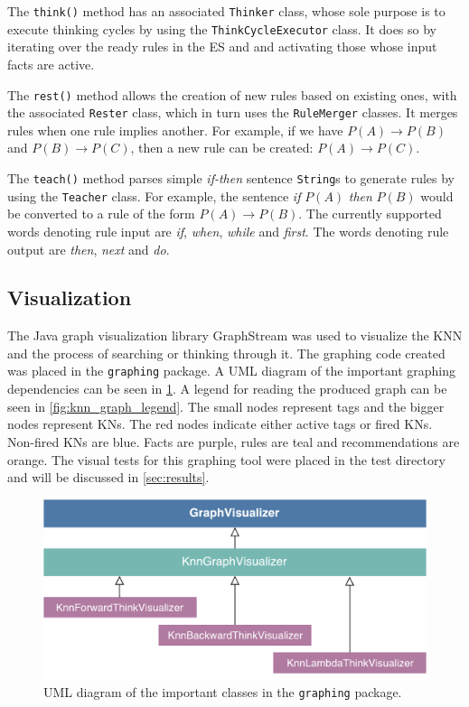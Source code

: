 \documentclass[titlepage,11pt]{article}
\newcommand{\code}[1]{\texttt{#1}}
\begin{document}
The \code{think()} method has an associated \code{Thinker} class, whose sole purpose is to execute thinking cycles by using the \code{ThinkCycleExecutor} class. It does so by iterating over the ready rules in the ES and and activating those whose input facts are active.

The \code{rest()} method allows the creation of new rules based on existing ones, with the associated \code{Rester} class, which in turn uses the \code{RuleMerger} classes. It merges rules when one rule implies another. For example, if we have $P(A) \rightarrow P(B)$ and $P(B) \rightarrow P(C)$, then a new rule can be created: $P(A) \rightarrow P(C)$.

The \code{teach()} method parses simple \emph{if-then} sentence \code{String}s to generate rules by using the \code{Teacher} class. For example, the sentence \emph{if} $P(A)$ \emph{then} $P(B)$ would be converted to a rule of the form $P(A) \rightarrow P(B)$. The currently supported words denoting rule input are \emph{if}, \emph{when}, \emph{while} and \emph{first}. The words denoting rule output are \emph{then}, \emph{next} and \emph{do}.

\subsection{Visualization} \label{sec:impl_visualization}
The Java graph visualization library GraphStream was used to visualize the KNN and the process of searching or thinking through it. The graphing code created was placed in the \code{graphing} package. A UML diagram of the important graphing dependencies can be seen in \cref{fig:uml_graphing}. A legend for reading the produced graph can be seen in \cref{fig:knn_graph_legend}. The small nodes represent tags and the bigger nodes represent KNs. The red nodes indicate either active tags or fired KNs. Non-fired KNs are blue. Facts are purple, rules are teal and recommendations are orange. The visual tests for this graphing tool were placed in the test directory and will be discussed in \cref{sec:results}.

\begin{figure}[!htb]
	\includegraphics[width=\columnwidth]{figures/uml_graphing.pdf}
	\caption{UML diagram of the important classes in the \code{graphing} package.}
	\label{fig:uml_graphing}
\end{figure}
\end{document}
